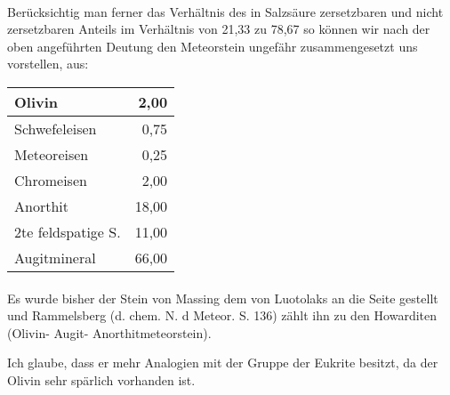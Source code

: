 \documentclass[a4paper, 11pt, oneside]{article}
\begin{document}
\paragraph{}
Berücksichtig man ferner das Verhältnis des in Salzsäure zersetzbaren und nicht zersetzbaren Anteils im Verhältnis von 21,33 zu 78,67 so können wir nach der oben angeführten Deutung den Meteorstein ungefähr zusammengesetzt uns vorstellen, aus:
\begin{center}
    \begin{tabular}{ |l|r| } 
    \hline
    Olivin & 2,00\\\hline
    Schwefeleisen & 0,75\\\hline
    Meteoreisen & 0,25\\\hline
    Chromeisen & 2,00\\\hline
    Anorthit & 18,00\\\hline
    2te feldspatige S. & 11,00\\\hline
    Augitmineral & 66,00\\
    \hline
    \end{tabular}
\end{center}
\paragraph{}
Es wurde bisher der Stein von Massing dem von Luotolaks an die Seite gestellt und Rammelsberg (d. chem. N. d Meteor. S. 136) zählt ihn zu den Howarditen (Olivin- Augit- Anorthitmeteorstein).

Ich glaube, dass er mehr Analogien mit der Gruppe der Eukrite besitzt, da der Olivin sehr spärlich vorhanden ist.
\end{document}
